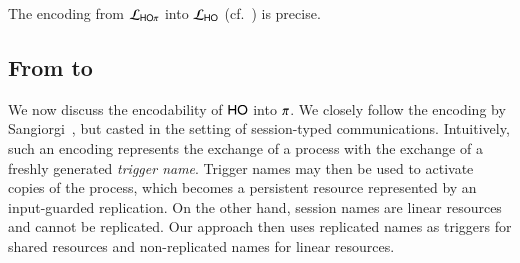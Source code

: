 \begin{theorem}
\label{f:enc:hopitoho}
The encoding from $\mathcal{L}_{\mathsf{HO}\pi}$ into $\mathcal{L}_{\mathsf{HO}}$ (cf.~)
is precise. 
\end{theorem}

\subsection{From \HOp to \sessp}
\label{subsec:HOp_to_sessp}
\noi 
We now discuss the encodability of  $\mathsf{HO}$ into $\pi$. %
We closely follow the encoding  by 
Sangiorgi~\cite{San92,SaWabook}, but casted in the setting of session-typed communications. 
Intuitively, such an encoding  represents the exchange of a process with the exchange of a freshly generated \emph{trigger name}. 
Trigger names may then be used to activate copies of the process, which becomes a persistent resource represented by an input-guarded replication.
On the other hand, session names are linear resources and cannot be replicated.
Our
approach %
then uses replicated names
as triggers for shared resources and non-replicated names
for linear resources.

